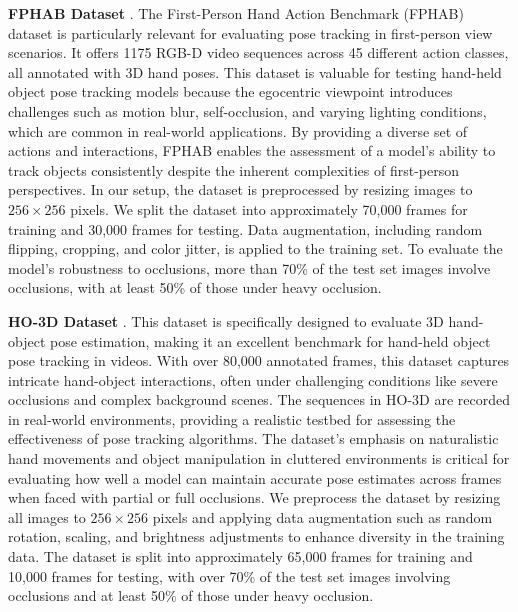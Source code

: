 \noindent \textbf{FPHAB Dataset} \cite{garcia2018first}. The First-Person Hand Action Benchmark (FPHAB) dataset is particularly relevant for evaluating pose tracking in first-person view scenarios. It offers 1175 RGB-D video sequences across 45 different action classes, all annotated with 3D hand poses. This dataset is valuable for testing hand-held object pose tracking models because the egocentric viewpoint introduces challenges such as motion blur, self-occlusion, and varying lighting conditions, which are common in real-world applications. By providing a diverse set of actions and interactions, FPHAB enables the assessment of a model's ability to track objects consistently despite the inherent complexities of first-person perspectives. In our setup, the dataset is preprocessed by resizing images to $256 \times 256$ pixels. We split the dataset into approximately 70,000 frames for training and 30,000 frames for testing. Data augmentation, including random flipping, cropping, and color jitter, is applied to the training set. To evaluate the model's robustness to occlusions, more than 70\% of the test set images involve occlusions, with at least 50\% of those under heavy occlusion.

\noindent \textbf{HO-3D Dataset} \cite{hampali2020honnotate}. This dataset is specifically designed to evaluate 3D hand-object pose estimation, making it an excellent benchmark for hand-held object pose tracking in videos. With over 80,000 annotated frames, this dataset captures intricate hand-object interactions, often under challenging conditions like severe occlusions and complex background scenes. The sequences in HO-3D are recorded in real-world environments, providing a realistic testbed for assessing the effectiveness of pose tracking algorithms. The dataset's emphasis on naturalistic hand movements and object manipulation in cluttered environments is critical for evaluating how well a model can maintain accurate pose estimates across frames when faced with partial or full occlusions. We preprocess the dataset by resizing all images to $256 \times 256$ pixels and applying data augmentation such as random rotation, scaling, and brightness adjustments to enhance diversity in the training data. The dataset is split into approximately 65,000 frames for training and 10,000 frames for testing, with over 70\% of the test set images involving occlusions and at least 50\% of those under heavy occlusion.

